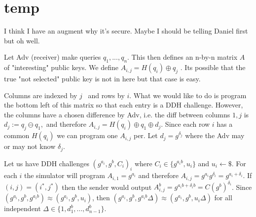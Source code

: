 \pagebreak
\section{temp}

I think I have an augment why it's secure. Maybe I should be telling Daniel first but oh well.

Let Adv (receiver) make queries $q_1,...,q_n$. This then defines an n-by-n matrix $A$ of "interesting" public keys. We define $A_{i,j}=H(q_i)\oplus q_j$ . Its possible that the true "not selected" public key is not in here but that case is easy.

Columns are indexed by $j$  and rows by $i$. What we would like to do is program the bottom left of this matrix so that each entry is a DDH challenge. However, the columns have a chosen difference by Adv, i.e. the diff between columns $1,j$ is $d_j:=q_{j}\ominus q_{1}$, and therefore $A_{i,j}=H(q_i)\oplus q_1\oplus d_j$. Since each row $i$ has a common $H(q_i)$ we can program one $A_{i,j}$ per. Let $d_j=g^{\delta_j}$ where the Adv may or may not know $\delta_j$.

Let us have DDH challenges $(g^{a_i}, g^{b}, C_i)_i$ where $C_i\in \{g^{a_ib}, u_i\}$ and $u_i\gets \$$. For each $i$ the simulator will program $A_{i,1}=g^{a_i}$ and therefore  $A_{i,j}=g^{a_i}g^{\delta_i}=g^{a_i+\delta_i}$. If  $(i,j)=(i^*,j^*)$ then the sender would output $A_{i,j}^b=g^{a_ib+\delta_ib}=C(g^b)^{\delta_i}$. Since $(g^{a_i}, g^{b}, g^{a_ib}) \approx (g^{a_i}, g^{b}, u_i)$, then $(g^{a_i}, g^{b}, g^{a_ib}\Delta) \approx (g^{a_i}, g^{b}, u_i\Delta)$ for all independent $\Delta\in \{1,d_1^b,...,d_{n-1}^b\}$.


